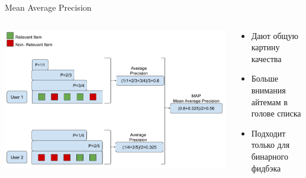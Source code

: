 \documentclass[11pt,aspectratio=169,handout]{beamer}
\begin{document}
\begin{frame}{Mean Average Precision \cite{MOUSSA}}

\begin{columns}
\begin{column}{0.5\textwidth}
   \begin{center}
		\includegraphics[scale=0.22]{images/map.png}
   \end{center}
\end{column}
\begin{column}{0.4\textwidth}
    \begin{tcolorbox}[colback=info!5,colframe=info!80,title=]
      \begin{itemize}
      \item Дают общую картину качества
      \item Больше внимания айтемам в голове списка
      \end{itemize}
    \end{tcolorbox}
    \begin{tcolorbox}[colback=warn!5,colframe=warn!80,title=]
      \begin{itemize}
      \item Подходит только для бинарного фидбэка
      \end{itemize}
    \end{tcolorbox}
\end{column}
\end{columns}

\end{frame}
\end{document}
